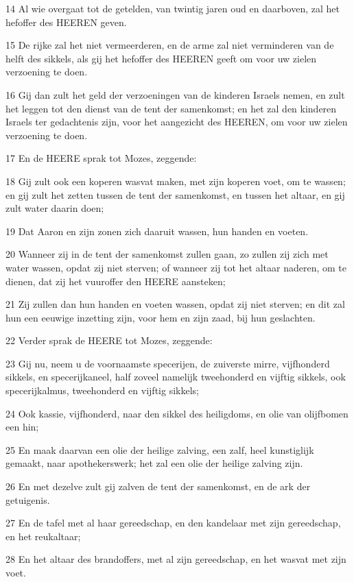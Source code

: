 \par 14 Al wie overgaat tot de getelden, van twintig jaren oud en daarboven, zal het hefoffer des HEEREN geven.
\par 15 De rijke zal het niet vermeerderen, en de arme zal niet verminderen van de helft des sikkels, als gij het hefoffer des HEEREN geeft om voor uw zielen verzoening te doen.
\par 16 Gij dan zult het geld der verzoeningen van de kinderen Israels nemen, en zult het leggen tot den dienst van de tent der samenkomst; en het zal den kinderen Israels ter gedachtenis zijn, voor het aangezicht des HEEREN, om voor uw zielen verzoening te doen.
\par 17 En de HEERE sprak tot Mozes, zeggende:
\par 18 Gij zult ook een koperen wasvat maken, met zijn koperen voet, om te wassen; en gij zult het zetten tussen de tent der samenkomst, en tussen het altaar, en gij zult water daarin doen;
\par 19 Dat Aaron en zijn zonen zich daaruit wassen, hun handen en voeten.
\par 20 Wanneer zij in de tent der samenkomst zullen gaan, zo zullen zij zich met water wassen, opdat zij niet sterven; of wanneer zij tot het altaar naderen, om te dienen, dat zij het vuuroffer den HEERE aansteken;
\par 21 Zij zullen dan hun handen en voeten wassen, opdat zij niet sterven; en dit zal hun een eeuwige inzetting zijn, voor hem en zijn zaad, bij hun geslachten.
\par 22 Verder sprak de HEERE tot Mozes, zeggende:
\par 23 Gij nu, neem u de voornaamste specerijen, de zuiverste mirre, vijfhonderd sikkels, en specerijkaneel, half zoveel namelijk tweehonderd en vijftig sikkels, ook specerijkalmus, tweehonderd en vijftig sikkels;
\par 24 Ook kassie, vijfhonderd, naar den sikkel des heiligdoms, en olie van olijfbomen een hin;
\par 25 En maak daarvan een olie der heilige zalving, een zalf, heel kunstiglijk gemaakt, naar apothekerswerk; het zal een olie der heilige zalving zijn.
\par 26 En met dezelve zult gij zalven de tent der samenkomst, en de ark der getuigenis.
\par 27 En de tafel met al haar gereedschap, en den kandelaar met zijn gereedschap, en het reukaltaar;
\par 28 En het altaar des brandoffers, met al zijn gereedschap, en het wasvat met zijn voet.
